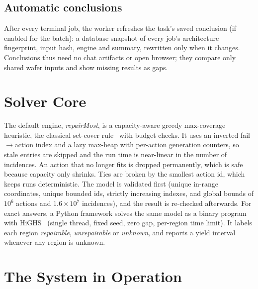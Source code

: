 \documentclass[conference]{IEEEtran}
\begin{document}
\subsection{Automatic conclusions}
After every terminal job, the worker refreshes the task's saved conclusion
(if enabled for the batch): a database snapshot of every job's architecture
fingerprint, input hash, engine and summary, rewritten only when it
changes. Conclusions thus need no chat artifacts or open browser; they
compare only shared wafer inputs and show missing results as gaps.

\section{Solver Core}
\label{sec:solver}

The default engine, \emph{repairMost}, is a capacity-aware greedy
max-coverage heuristic, the classical set-cover rule~\cite{johnson1974}
with budget checks. It uses an inverted fail$\rightarrow$action index and a
lazy max-heap with per-action generation counters, so stale entries are
skipped and the run time is near-linear in the number of incidences. An
action that no longer fits is dropped permanently, which is safe because
capacity only shrinks. Ties are broken by the smallest action id, which
keeps runs deterministic. The model is validated first (unique in-range
coordinates, unique bounded ids, strictly increasing indexes, and global
bounds of $10^6$ actions and $1.6\times10^7$ incidences), and the result is
re-checked afterwards. For exact answers, a Python framework solves the same
model as a binary program with HiGHS~\cite{huangfu2018} (single thread,
fixed seed, zero gap, per-region time limit). It labels each region
\emph{repairable}, \emph{unrepairable} or \emph{unknown}, and reports a yield
interval whenever any region is unknown.

\section{The System in Operation}
\label{sec:operation}
\end{document}
